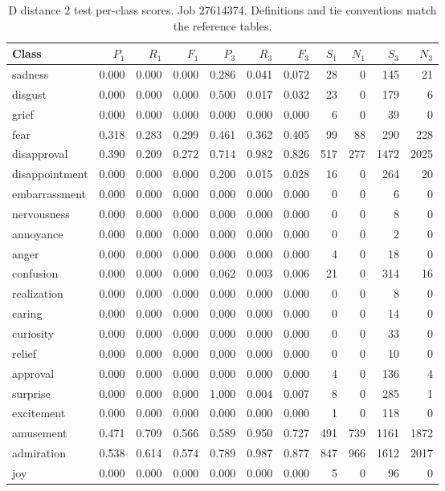 \begin{table}[!htbp]
\centering
\scriptsize
\setlength{\tabcolsep}{5pt}
\begin{tabular}{lrrrrrrrrrr}
\toprule
Class & $P_1$ & $R_1$ & $F_1$ & $P_3$ & $R_3$ & $F_3$ & $S_1$ & $N_1$ & $S_3$ & $N_3$ \\
\midrule
sadness & 0.000 & 0.000 & 0.000 & 0.286 & 0.041 & 0.072 & 28 & 0 & 145 & 21 \\
disgust & 0.000 & 0.000 & 0.000 & 0.500 & 0.017 & 0.032 & 23 & 0 & 179 & 6 \\
grief & 0.000 & 0.000 & 0.000 & 0.000 & 0.000 & 0.000 & 6 & 0 & 39 & 0 \\
fear & 0.318 & 0.283 & 0.299 & 0.461 & 0.362 & 0.405 & 99 & 88 & 290 & 228 \\
disapproval & 0.390 & 0.209 & 0.272 & 0.714 & 0.982 & 0.826 & 517 & 277 & 1472 & 2025 \\
disappointment & 0.000 & 0.000 & 0.000 & 0.200 & 0.015 & 0.028 & 16 & 0 & 264 & 20 \\
embarrassment & 0.000 & 0.000 & 0.000 & 0.000 & 0.000 & 0.000 & 0 & 0 & 6 & 0 \\
nervousness & 0.000 & 0.000 & 0.000 & 0.000 & 0.000 & 0.000 & 0 & 0 & 8 & 0 \\
annoyance & 0.000 & 0.000 & 0.000 & 0.000 & 0.000 & 0.000 & 0 & 0 & 2 & 0 \\
anger & 0.000 & 0.000 & 0.000 & 0.000 & 0.000 & 0.000 & 4 & 0 & 18 & 0 \\
confusion & 0.000 & 0.000 & 0.000 & 0.062 & 0.003 & 0.006 & 21 & 0 & 314 & 16 \\
realization & 0.000 & 0.000 & 0.000 & 0.000 & 0.000 & 0.000 & 0 & 0 & 8 & 0 \\
caring & 0.000 & 0.000 & 0.000 & 0.000 & 0.000 & 0.000 & 0 & 0 & 14 & 0 \\
curiosity & 0.000 & 0.000 & 0.000 & 0.000 & 0.000 & 0.000 & 0 & 0 & 33 & 0 \\
relief & 0.000 & 0.000 & 0.000 & 0.000 & 0.000 & 0.000 & 0 & 0 & 10 & 0 \\
approval & 0.000 & 0.000 & 0.000 & 0.000 & 0.000 & 0.000 & 4 & 0 & 136 & 4 \\
surprise & 0.000 & 0.000 & 0.000 & 1.000 & 0.004 & 0.007 & 8 & 0 & 285 & 1 \\
excitement & 0.000 & 0.000 & 0.000 & 0.000 & 0.000 & 0.000 & 1 & 0 & 118 & 0 \\
amusement & 0.471 & 0.709 & 0.566 & 0.589 & 0.950 & 0.727 & 491 & 739 & 1161 & 1872 \\
admiration & 0.538 & 0.614 & 0.574 & 0.789 & 0.987 & 0.877 & 847 & 966 & 1612 & 2017 \\
joy & 0.000 & 0.000 & 0.000 & 0.000 & 0.000 & 0.000 & 5 & 0 & 96 & 0 \\
\bottomrule
\end{tabular}
\caption{D distance 2 test per-class scores. Job 27614374. Definitions and tie conventions match the reference tables.}
\label{tab:classes-d_distance_k2}
\end{table}
